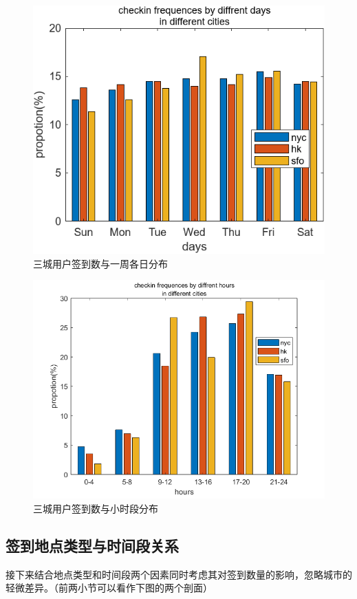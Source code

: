 \documentclass[UTF8]{ctexart}
\begin{document}
		\begin{figure}[H]
			\centering
			\includegraphics{checkin_day_l_nhs.png}
			\caption{三城用户签到数与一周各日分布}
			\label{day_c_nhs}
		\end{figure}
		\begin{figure}[H]
			\centering
			\includegraphics[scale=0.6]{checkin_hour_l_nhs.png}
			\caption{三城用户签到数与小时段分布}
			\label{hour_c_nhs}
		\end{figure}
		
		\subsection{签到地点类型与时间段关系}
		接下来结合地点类型和时间段两个因素同时考虑其对签到数量的影响，忽略城市的轻微差异。（前两小节可以看作下图的两个剖面）
		
\end{document}
